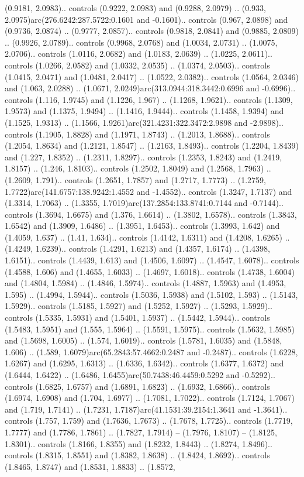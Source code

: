 (0.9181, 2.0983).. controls (0.9222, 2.0983) and (0.9288, 2.0979) .. (0.933, 2.0975)arc(276.6242:287.5722:0.1601 and -0.1601).. controls (0.967, 2.0898) and (0.9736, 2.0874) .. (0.9777, 2.0857).. controls (0.9818, 2.0841) and (0.9885, 2.0809) .. (0.9926, 2.0789).. controls (0.9968, 2.0768) and (1.0034, 2.0731) .. (1.0075, 2.0706).. controls (1.0116, 2.0682) and (1.0183, 2.0639) .. (1.0225, 2.0611).. controls (1.0266, 2.0582) and (1.0332, 2.0535) .. (1.0374, 2.0503).. controls (1.0415, 2.0471) and (1.0481, 2.0417) .. (1.0522, 2.0382).. controls (1.0564, 2.0346) and (1.063, 2.0288) .. (1.0671, 2.0249)arc(313.0944:318.3442:0.6996 and -0.6996).. controls (1.116, 1.9745) and (1.1226, 1.967) .. (1.1268, 1.9621).. controls (1.1309, 1.9573) and (1.1375, 1.9494) .. (1.1416, 1.9444).. controls (1.1458, 1.9394) and (1.1525, 1.9313) .. (1.1566, 1.9261)arc(321.4231:322.3472:2.9898 and -2.9898).. controls (1.1905, 1.8828) and (1.1971, 1.8743) .. (1.2013, 1.8688).. controls (1.2054, 1.8634) and (1.2121, 1.8547) .. (1.2163, 1.8493).. controls (1.2204, 1.8439) and (1.227, 1.8352) .. (1.2311, 1.8297).. controls (1.2353, 1.8243) and (1.2419, 1.8157) .. (1.246, 1.8103).. controls (1.2502, 1.8049) and (1.2568, 1.7963) .. (1.2609, 1.791).. controls (1.2651, 1.7857) and (1.2717, 1.7773) .. (1.2759, 1.7722)arc(141.6757:138.9242:1.4552 and -1.4552).. controls (1.3247, 1.7137) and (1.3314, 1.7063) .. (1.3355, 1.7019)arc(137.2854:133.8741:0.7144 and -0.7144).. controls (1.3694, 1.6675) and (1.376, 1.6614) .. (1.3802, 1.6578).. controls (1.3843, 1.6542) and (1.3909, 1.6486) .. (1.3951, 1.6453).. controls (1.3993, 1.642) and (1.4059, 1.637) .. (1.41, 1.634).. controls (1.4142, 1.6311) and (1.4208, 1.6265) .. (1.4249, 1.6239).. controls (1.4291, 1.6213) and (1.4357, 1.6174) .. (1.4398, 1.6151).. controls (1.4439, 1.613) and (1.4506, 1.6097) .. (1.4547, 1.6078).. controls (1.4588, 1.606) and (1.4655, 1.6033) .. (1.4697, 1.6018).. controls (1.4738, 1.6004) and (1.4804, 1.5984) .. (1.4846, 1.5974).. controls (1.4887, 1.5963) and (1.4953, 1.595) .. (1.4994, 1.5944).. controls (1.5036, 1.5938) and (1.5102, 1.593) .. (1.5143, 1.5929).. controls (1.5185, 1.5927) and (1.5252, 1.5927) .. (1.5293, 1.5929).. controls (1.5335, 1.5931) and (1.5401, 1.5937) .. (1.5442, 1.5944).. controls (1.5483, 1.5951) and (1.555, 1.5964) .. (1.5591, 1.5975).. controls (1.5632, 1.5985) and (1.5698, 1.6005) .. (1.574, 1.6019).. controls (1.5781, 1.6035) and (1.5848, 1.606) .. (1.589, 1.6079)arc(65.2843:57.4662:0.2487 and -0.2487).. controls (1.6228, 1.6267) and (1.6295, 1.6313) .. (1.6336, 1.6342).. controls (1.6377, 1.6372) and (1.6444, 1.6422) .. (1.6486, 1.6455)arc(50.7438:46.4459:0.5292 and -0.5292).. controls (1.6825, 1.6757) and (1.6891, 1.6823) .. (1.6932, 1.6866).. controls (1.6974, 1.6908) and (1.704, 1.6977) .. (1.7081, 1.7022).. controls (1.7124, 1.7067) and (1.719, 1.7141) .. (1.7231, 1.7187)arc(41.1531:39.2154:1.3641 and -1.3641).. controls (1.757, 1.759) and (1.7636, 1.7673) .. (1.7678, 1.7725).. controls (1.7719, 1.7777) and (1.7786, 1.7861) .. (1.7827, 1.7914) -- (1.7976, 1.8107) -- (1.8125, 1.8301).. controls (1.8166, 1.8355) and (1.8232, 1.8443) .. (1.8274, 1.8496).. controls (1.8315, 1.8551) and (1.8382, 1.8638) .. (1.8424, 1.8692).. controls (1.8465, 1.8747) and (1.8531, 1.8833) .. (1.8572, 